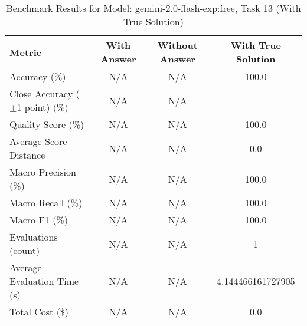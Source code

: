 \begin{table}[htbp]
\centering
\caption{Benchmark Results for Model: gemini-2.0-flash-exp:free, Task 13 (With True Solution)}
\begin{tabular}{lccc}
\toprule
\textbf{Metric} & \textbf{With Answer} & \textbf{Without Answer} & \textbf{With True Solution} \\
\midrule
Accuracy (\%) & N/A & N/A & 100.0 \\
Close Accuracy ($\pm$1 point) (\%) & N/A & N/A \\
Quality Score (\%) & N/A & N/A & 100.0 \\
Average Score Distance & N/A & N/A & 0.0 \\
Macro Precision (\%) & N/A & N/A & 100.0 \\
Macro Recall (\%) & N/A & N/A & 100.0 \\
Macro F1 (\%) & N/A & N/A & 100.0 \\
Evaluations (count) & N/A & N/A & 1 \\
Average Evaluation Time (s) & N/A & N/A & 4.144466161727905 \\
Total Cost (\$) & N/A & N/A & 0.0 \\
\bottomrule
\end{tabular}
\end{table}